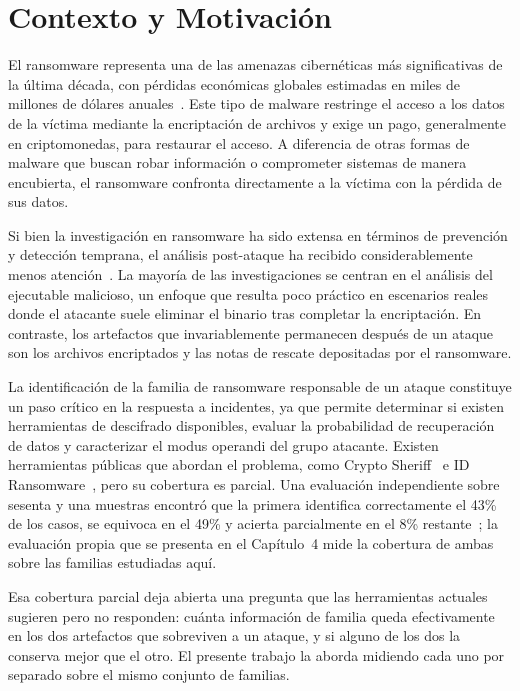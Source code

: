 \section{Contexto y Motivación}

El ransomware representa una de las amenazas cibernéticas más significativas de la última década, con pérdidas económicas globales estimadas en miles de millones de dólares anuales~\cite{europol2023}. Este tipo de malware restringe el acceso a los datos de la víctima mediante la encriptación de archivos y exige un pago, generalmente en criptomonedas, para restaurar el acceso. A diferencia de otras formas de malware que buscan robar información o comprometer sistemas de manera encubierta, el ransomware confronta directamente a la víctima con la pérdida de sus datos.

Si bien la investigación en ransomware ha sido extensa en términos de prevención y detección temprana, el análisis post-ataque ha recibido considerablemente menos atención~\cite{paper_4_comparison_of_entropy}. La mayoría de las investigaciones se centran en el análisis del ejecutable malicioso, un enfoque que resulta poco práctico en escenarios reales donde el atacante suele eliminar el binario tras completar la encriptación. En contraste, los artefactos que invariablemente permanecen después de un ataque son los archivos encriptados y las notas de rescate depositadas por el ransomware.

La identificación de la familia de ransomware responsable de un ataque constituye un paso crítico en la respuesta a incidentes, ya que permite determinar si existen herramientas de descifrado disponibles, evaluar la probabilidad de recuperación de datos y caracterizar el modus operandi del grupo atacante. Existen herramientas públicas que abordan el problema, como Crypto Sheriff~\cite{cryptosheriff} e ID Ransomware~\cite{idransomware}, pero su cobertura es parcial. Una evaluación independiente sobre sesenta y una muestras encontró que la primera identifica correctamente el 43\% de los casos, se equivoca en el 49\% y acierta parcialmente en el 8\% restante~\cite{paper_2_on_efectiveness}; la evaluación propia que se presenta en el Capítulo~4 mide la cobertura de ambas sobre las familias estudiadas aquí.

Esa cobertura parcial deja abierta una pregunta que las herramientas actuales sugieren pero no responden: cuánta información de familia queda efectivamente en los dos artefactos que sobreviven a un ataque, y si alguno de los dos la conserva mejor que el otro. El presente trabajo la aborda midiendo cada uno por separado sobre el mismo conjunto de familias.

